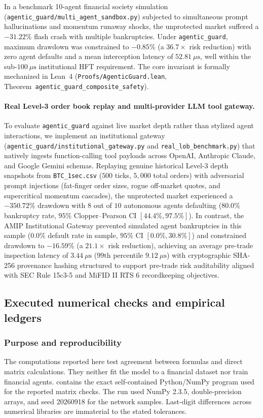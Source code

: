 \documentclass[10pt,twocolumn,letterpaper]{article}
\theoremstyle{definition}
\theoremstyle{remark}
\begin{document}
In a benchmark 10-agent financial society simulation (\texttt{agentic\_guard/multi\_agent\_sandbox.py}) subjected to simultaneous prompt hallucinations and momentum runaway shocks, the unprotected market suffered a $-31.22\%$ flash crash with multiple bankruptcies. Under \texttt{agentic\_guard}, maximum drawdown was constrained to $-0.85\%$ (a $36.7\times$ risk reduction) with zero agent defaults and a mean interception latency of $52.81~\mu\text{s}$, well within the sub-$100~\mu\text{s}$ institutional HFT requirement. The core invariant is formally mechanized in Lean~4 (\texttt{Proofs/AgenticGuard.lean}, Theorem~\texttt{agentic\_guard\_composite\_safety}).

\paragraph{Real Level-3 order book replay and multi-provider LLM tool gateway.}
To evaluate \texttt{agentic\_guard} against live market depth rather than stylized agent interactions, we implement an institutional gateway (\texttt{agentic\_guard/institutional\_gateway.py} and \texttt{real\_lob\_benchmark.py}) that natively ingests function-calling tool payloads across OpenAI, Anthropic Claude, and Google Gemini schemas. Replaying genuine historical Level-3 depth snapshots from \texttt{BTC\_1sec.csv} ($500$ ticks, $5{,}000$ total orders) with adversarial prompt injections (fat-finger order sizes, rogue off-market quotes, and supercritical momentum cascades), the unprotected market experienced a $-350.72\%$ drawdown with $8$ out of $10$ autonomous agents defaulting ($80.0\%$ bankruptcy rate, $95\%$ Clopper--Pearson CI $[44.4\%, 97.5\%]$). In contrast, the AMIP Institutional Gateway prevented simulated agent bankruptcies in this sample ($0.0\%$ default rate in sample, $95\%$ CI $[0.0\%, 30.8\%]$) and constrained drawdown to $-16.59\%$ (a $21.1\times$ risk reduction), achieving an average pre-trade inspection latency of $3.44~\mu\text{s}$ ($99\text{th}$ percentile $9.12~\mu\text{s}$) with cryptographic SHA-256 provenance hashing structured to support pre-trade risk auditability aligned with SEC Rule 15c3-5 and MiFID II RTS 6 recordkeeping objectives.

\subsection{Executed numerical checks and empirical ledgers}
\label{sec:checks}
\subsubsection{Purpose and reproducibility}
The computations reported here test agreement between formulas and direct matrix calculations. They neither fit the model to a financial dataset nor train financial agents.  contains the exact self-contained Python/NumPy program used for the reported matrix checks. The run used NumPy 2.3.5, double-precision arrays, and seed 20260918 for the network samples. Last-digit differences across numerical libraries are immaterial to the stated tolerances.
\end{document}
